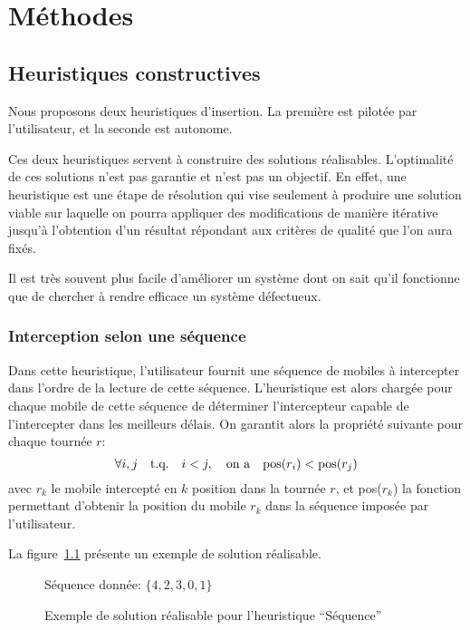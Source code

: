 \chapter{Méthodes}
	\section{Heuristiques constructives}
		Nous proposons deux heuristiques d'insertion. La première est pilotée par l'utilisateur, et la seconde est autonome.

		Ces deux heuristiques servent à construire des solutions réalisables. L'optimalité de ces solutions n'est pas garantie et n'est pas un objectif. En effet, une heuristique est une étape de résolution qui vise seulement à produire une solution viable sur laquelle on pourra appliquer des modifications de manière itérative jusqu'à l'obtention d'un résultat répondant aux critères de qualité que l'on aura fixés.

		Il est très souvent plus facile d'améliorer un système dont on sait qu'il fonctionne que de chercher à rendre efficace un système défectueux.
		\subsection{Interception selon une séquence}
		\label{sub:heuristic_sequence}
			Dans cette heuristique, l'utilisateur fournit une séquence de mobiles à intercepter dans l'ordre de la lecture de cette séquence. L'heuristique est alors chargée pour chaque mobile de cette séquence de déterminer l'intercepteur capable de l'intercepter dans les meilleurs délais. On garantit alors la propriété suivante pour chaque tournée $r$:
			\[
				\forall i, j \qtext{t.q.}  i<j, \qtext{on a} \text{pos}(r_i) < \text{pos}(r_j)
			\]
			avec $r_k$ le mobile intercepté en $k$\ieme{} position dans la tournée $r$, et pos($r_k$) la fonction permettant d'obtenir la position du mobile $r_k$ dans la séquence imposée par l'utilisateur.

			La figure~\ref{fig:heuristic_sequence_demo} présente un exemple de solution réalisable.

			\begin{figure}[h!]
			\centering
			Séquence donnée: $\{4, 2, 3, 0, 1\}$

			\begin{tikzpicture}[schema]
				
			\end{tikzpicture}
			\caption{Exemple de solution réalisable pour l'heuristique ``Séquence''}
			\label{fig:heuristic_sequence_demo}
			\end{figure}

